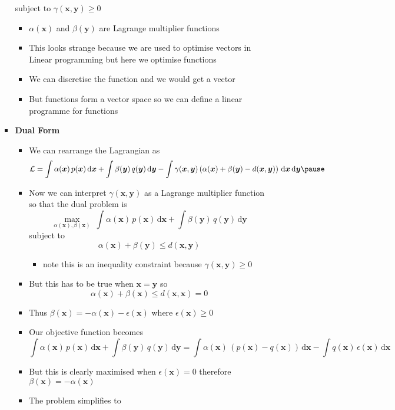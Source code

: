 \documentclass[11pt]{article}
\newcommand{\dd}{\mathrm{d}}
\begin{document}
\begin{itemize}
\begin{itemize}
\begin{itemize}
subject to \(\gamma(\bm{x},\bm{y})\geq 0\)
\begin{itemize}
\item \(\alpha(\bm{x})\) and \(\beta(\bm{y})\) are Lagrange multiplier functions
\item This looks strange because we are used to optimise vectors
in Linear programming but here we optimise functions
\item We can discretise the function and we would get a vector
\item But functions form a vector space so  we can define a
linear programme for functions
\end{itemize}
\item \textbf{Dual Form}
\begin{itemize}
\item We can rearrange the Lagrangian as
 \begin{align*}
  \mathcal{L} = \int \alpha(\bm{x})\,p(\bm{x})\, \dd \bm{x}
+ \int \beta(\bm{y})\,q(\bm{y})\,\dd \bm{y}
  - \int \gamma(\bm{x},\bm{y})\left( \alpha(\bm{x}) + \beta(\bm{y}) -
  d(\bm{x},\bm{y})\right)\, \dd \bm{x}\,\dd \bm{y}\pause
\end{align*}
\item Now we can interpret \(\gamma(\bm{x},\bm{y})\) as a Lagrange
multiplier function so that the dual problem is
$$ \max_{\alpha(\bm{x}),\beta(\bm{x})} \; \int
           \alpha(\bm{x})\,p(\bm{x})\, \dd \bm{x} + \int 
           \beta(\bm{y})\,q(\bm{y})\,\dd \bm{y} $$
subject to
$$ \alpha(\bm{x}) + \beta(\bm{y}) \leq d(\bm{x},\bm{y}) $$
\begin{itemize}
\item note this is an inequality constraint because \(\gamma(\bm{x},\bm{y})\geq0\)
\end{itemize}
\item But this has to be true when \(\bm{x}=\bm{y}\) so
$$ \alpha(\bm{x}) + \beta(\bm{x}) \leq d(\bm{x},\bm{x}) = 0 $$
\item Thus \(\beta(\bm{x}) = -\alpha(\bm{x}) - \epsilon(\bm{x})\)
where \(\epsilon(\bm{x})\geq0\)
\item Our objective function becomes
$$  \int \alpha(\bm{x})\,p(\bm{x})\, \dd \bm{x} + \int
            \beta(\bm{y})\,q(\bm{y})\,\dd \bm{y}
            = \int \alpha(\bm{x})\,\left(p(\bm{x}) - q(\bm{x})\right) \, \dd
            \bm{x} - \int q(\bm{x}) \, \epsilon(\bm{x}) \,\dd\bm{x} $$
\item But this is clearly maximised when \(\epsilon(\bm{x})=0\)
therefore \(\beta(\bm{x}) = -\alpha(\bm{x})\)
\item The problem simplifies to 

\end{itemize}
\end{itemize}
\end{itemize}
\end{itemize}
\end{document}
